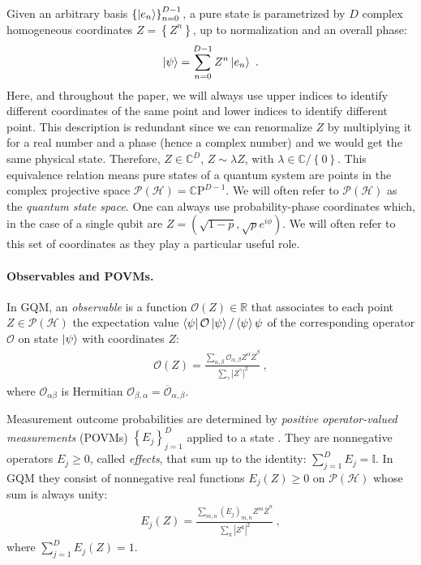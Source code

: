 \documentclass[draft,nofootinbib,pre,twocolumn,showpacs,showkeys,preprintnumbers,floatfix]{revtex4-1}
\newcommand{\1}{\mathbbm{1}}
\newcommand{\PH}{\mathcal{P}(\mathcal{H})}
\begin{document}
Given an arbitrary basis $\left\{\ket{e_n} \right\}_{n=0}^{D-1}$, a pure state is
parametrized by $D$ complex homogeneous coordinates $Z = \left\{      Z^n\right\}$, up to
normalization and an overall phase:
\begin{align*}
\ket{\psi} = \sum_{n=0}^{D-1} Z^n \ket{e_n}~.
\end{align*}
Here, and throughout the paper, we will always use upper indices to identify different 
coordinates of the same point and lower indices to identify different point. This 
description is redundant since we can renormalize $Z$ by multiplying it for a real number
and a phase (hence a complex number) and we would get the same physical state. Therefore, 
$Z \in \mathbb{C}^{D}$, $Z \sim \lambda Z$, with $\lambda \in \mathbb{C}/\left\{ 0\right\}$. This equivalence 
relation means pure states of a quantum system are points in the complex projective space $\mathcal{P}\left(
\mathcal{H} \right)=\mathbb{C}\mathrm{P}^{D-1}$. We will often refer to $\PH$ as the \emph{quantum 
state space}. One can always use probability-phase coordinates which, in the case of a single qubit
are $Z = (\sqrt{1-p},\sqrt{p} e^{i\phi})$. We will often refer to this set of coordinates as 
they play a particular useful role.

\paragraph*{Observables and POVMs.} In GQM, an \emph{observable} is a function $\mathcal{O}(Z) \in
\mathbb{R}$ that associates to each point  $Z \in \mathcal{P}(\mathcal{H})$ the
expectation value $\bra{\psi} \mathcal{O} \ket{\psi}/\braket{\psi}{\psi}$ of the corresponding
operator $\mathcal{O}$ on state $\ket{\psi}$ with coordinates $Z$:
\begin{align}
\mathcal{O}(Z) = \frac{\sum_{\alpha,\beta} \mathcal{O}_{\alpha,\beta}Z^\alpha \overline{Z}^\beta}{\sum_{\gamma} \left\vert Z^\gamma\right\vert^2}
  ~,
\label{eq:GQM_Observable}
\end{align}
where $\mathcal{O}_{\alpha \beta}$ is Hermitian $\mathcal{O}_{\beta,\alpha} = \overline{\mathcal{O}}_{\alpha,\beta}$.

Measurement outcome probabilities are determined by \emph{positive
operator-valued measurements} (POVMs) $\left\{E_j\right\}_{j=1}^D$ applied to a
state \cite{Nielsen2010,Heinosaari2012}. They are nonnegative operators
$E_j\geq 0$, called \emph{effects}, that sum up to the identity: $\sum_{j=1}^{D}
E_j = \mathbb{I}$. In GQM they consist of nonnegative real functions $E_j(Z)\ge
0$ on $\mathcal{P}(\mathcal{H})$ whose sum is always unity:
\begin{align}
E_j(Z) = \frac{\sum_{m,n}
  \left(E_j\right)_{m,n} Z^m \overline{Z}^n}{\sum_{k} \left\vert Z^k \right\vert^2}
  ~,
\label{eq:GQM_POVMs}
\end{align}
where $\sum_{j=1}^{D}E_j(Z) = 1$.
\end{document}
